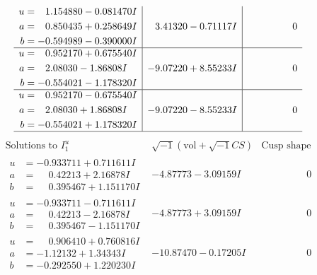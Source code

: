 \documentclass[1p]{elsarticle_modified}
\theoremstyle{definition}
\newcommand{\I}{\sqrt{-1}}
\begin{document}
$$\begin{array}{c|c|c}
\begin{aligned}
u &= \phantom{-}1.154880 - 0.081470 I \\
a &= \phantom{-}0.850435 + 0.258649 I \\
b &= -0.594989 - 0.390000 I\end{aligned}
 & \phantom{-}3.41320 - 0.71117 I & \phantom{-0.000000 } 0 \\ \hline\begin{aligned}
u &= \phantom{-}0.952170 + 0.675540 I \\
a &= \phantom{-}2.08030 - 1.86808 I \\
b &= -0.554021 - 1.178320 I\end{aligned}
 & -9.07220 + 8.55233 I & \phantom{-0.000000 } 0 \\ \hline\begin{aligned}
u &= \phantom{-}0.952170 - 0.675540 I \\
a &= \phantom{-}2.08030 + 1.86808 I \\
b &= -0.554021 + 1.178320 I\end{aligned}
 & -9.07220 - 8.55233 I & \phantom{-0.000000 } 0\\
 \hline 
 \end{array}$$\newpage$$\begin{array}{c|c|c}  
\text{Solutions to }I^u_{1}& \I (\text{vol} + \sqrt{-1}CS) & \text{Cusp shape}\\
 \hline 
\begin{aligned}
u &= -0.933711 + 0.711611 I \\
a &= \phantom{-}0.42213 + 2.16878 I \\
b &= \phantom{-}0.395467 + 1.151170 I\end{aligned}
 & -4.87773 - 3.09159 I & \phantom{-0.000000 } 0 \\ \hline\begin{aligned}
u &= -0.933711 - 0.711611 I \\
a &= \phantom{-}0.42213 - 2.16878 I \\
b &= \phantom{-}0.395467 - 1.151170 I\end{aligned}
 & -4.87773 + 3.09159 I & \phantom{-0.000000 } 0 \\ \hline\begin{aligned}
u &= \phantom{-}0.906410 + 0.760816 I \\
a &= -1.12132 + 1.34343 I \\
b &= -0.292550 + 1.220230 I\end{aligned}
 & -10.87470 - 0.17205 I & \phantom{-0.000000 } 0 \\ \hline\begin{aligned}

\end{aligned}
\end{array}$$
\end{document}
